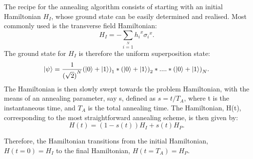 \documentclass[../main.tex]{subfiles}
\begin{document}
The recipe for the annealing algorithm consists of starting with an initial Hamiltonian $H_I$, whose ground state can be easily determined and realised. Most commonly used is the transverse field Hamiltonian: 
\begin{equation}
H_I=-\sum\limits_{i=1}\limits^{N}{h_i}^x{\sigma_i}^x. \label{eq:b5}
\end{equation}
The ground state for $H_I$ is therefore the uniform superposition state: 
\begin{equation}
\ket{\psi}=\frac{1}{{(\sqrt{2})}^N}{(\ket{0}+\ket{1})}_1*{(\ket{0}+\ket{1})}_2*....*{(\ket{0}+\ket{1})}_N. \label{eq:b6}
\end{equation}
The Hamiltonian is then slowly swept towards the problem Hamiltonian, with the means of an annealing parameter, say s, defined as $s=t/T_A$, where t is the instantaneous time, and $T_A$ is the total annealing time. The Hamiltonian, H(t), corresponding to the most straightforward annealing scheme, is then given by: 
\begin{equation}
H(t)= (1-s(t))H_I + s(t)H_P. \label{eq:b7}
\end{equation}

Therefore, the Hamiltonian transitions from the initial Hamiltonian, $H(t=0)=H_I$ to the final Hamiltonian, $H(t=T_A)=H_P$. \\
\end{document}
